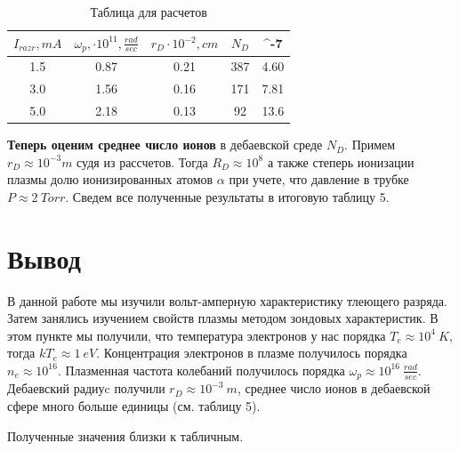 \begin{table}[!]
  \caption{Таблица для расчетов}
  \begin{center}
  	\begin{tabular}{|c|c|c|c|c|}
  	    \hline
  	$I_{razr}, mA$ & $\omega_p, \cdot 10^{11}, \frac{rad}{sec}$ & $r_D \cdot 10^{-2}, cm$ & $N_D $ & \alpha \cdot 10^{-7} \\
  	    \hline
  	1.5 & 0.87 & 0.21 &  387 &  4.60  \\
  		\hline
    3.0 & 1.56 & 0.16  & 171 &  7.81  \\
  		\hline
  	5.0 & 2.18 & 0.13  & 92 & 13.6  \\
  		\hline
  	\end{tabular}
  \end{center}
\label{B_table}
\end{table}



\textbf{Теперь оценим среднее число ионов} в дебаевской среде $N_D$. 
Примем $r_D \approx 10^{-3} m$ судя из рассчетов. Тогда $R_D \approx 10^{8}$
а также степерь ионизации плазмы долю ионизированных атомов $\alpha$ при учете, что давление в трубке $P \approx  2 \: Torr$.
Сведем все полученные результаты в итоговую таблицу 5.


\section{Вывод}

В данной работе мы изучили вольт-амперную характеристику тлеющего разряда.
Затем занялись изучением свойств плазмы методом зондовых характеристик.
\newline
В этом пункте мы получили, что температура электронов у нас порядка $T_e \approx 10^{4} \: K$, тогда $kT_e \approx 1 \: eV$. 
\newline
Концентрация электронов в плазме получилось порядка $n_e \approx 10^{16}$. 
\newline
Плазменная частота колебаний получилось порядка $\omega_p \approx 10^{16} \: \frac{rad}{sec}$.
\newline
Дебаевский радиуc получили $r_D \approx 10^{-3} \: m$, среднее число ионов в дебаевской сфере много больше единицы (см. таблицу 5). 

Полученные значения близки к табличным. 

